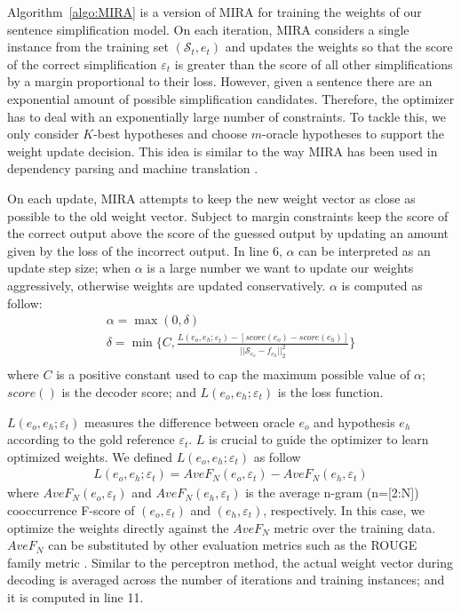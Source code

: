 \documentclass[10pt]{article}
\begin{document}
Algorithm~\ref{algo:MIRA} is a version of MIRA for training the weights of our sentence simplification model.
On each iteration, MIRA considers a single instance from the training set $(\mathcal{S}_t, e_t)$ and updates the weights so that the score of the correct simplification $\varepsilon_t$ is greater than the score of all other simplifications by a margin proportional to their loss.
However, given a sentence there are an exponential amount of possible simplification candidates.
Therefore, the optimizer has to deal with an exponentially large number of constraints.
To tackle this, we only consider $K$-best hypotheses and choose $m$-oracle hypotheses to support the weight update decision.
This idea is similar to the way MIRA has been used in dependency parsing and machine translation \cite{McDonald-et-al:2005,acl06:liang,watanabe-EtAl:2007:EMNLP-CoNLL}.

On each update, MIRA attempts to keep the new weight vector as close as possible to the old weight vector.
Subject to margin constraints keep the score of the correct output above the score of the guessed output by updating an amount given by the loss of the incorrect output.
In line 6, $\alpha$ can be interpreted as an update step size; when $\alpha$ is a large number we want to update our weights aggressively, otherwise weights are updated conservatively.
$\alpha$ is computed as follow:
\begin{equation}
\begin{array}{l}
\alpha = \max ( 0, \delta ) \\
\delta = \min \Bigg\lbrace C, \frac{ L(e_o, e_h ; \varepsilon_t) - [score(e_o) - score(e_h)] }{ ||\mathcal{S}_{e_o}  - f_{e_h}||_{2}^2}  \Bigg\rbrace \\
\end{array}
\label{equa:update}
\end{equation}
where 
$C$ is a positive constant used to cap the maximum possible value of $\alpha$; $score()$ is the decoder score; and $L(e_o, e_h ; \varepsilon_t)$ is the loss function.

$L(e_o, e_h ; \varepsilon_t)$ measures the difference between oracle $e_o$ and hypothesis $e_h$ according to the gold reference $\varepsilon_t$.
$L$ is crucial to guide the optimizer to learn optimized weights.
We defined $L(e_o, e_h ; \varepsilon_t)$ as follow
\begin{equation}
\begin{array}{l}
L(e_o, e_h ; \varepsilon_t) = AveF_N(e_o,\varepsilon_t) - AveF_N(e_h,\varepsilon_t) 
\end{array}
\end{equation}
where $AveF_N(e_o,\varepsilon_t)$ and $AveF_N(e_h,\varepsilon_t)$ is the average n-gram (n=[2:N]) cooccurrence F-score of $(e_o,\varepsilon_t)$ and $(e_h,\varepsilon_t)$, respectively.
In this case, we optimize the weights directly against the $AveF_N$ metric over the training data.
$AveF_N$ can be substituted by other evaluation metrics such as the ROUGE family metric \cite{lin-ROUGE:2004}.
Similar to the perceptron method, the actual weight vector during decoding is averaged across the number of iterations and training instances; and it is computed in line 11.
\end{document}
